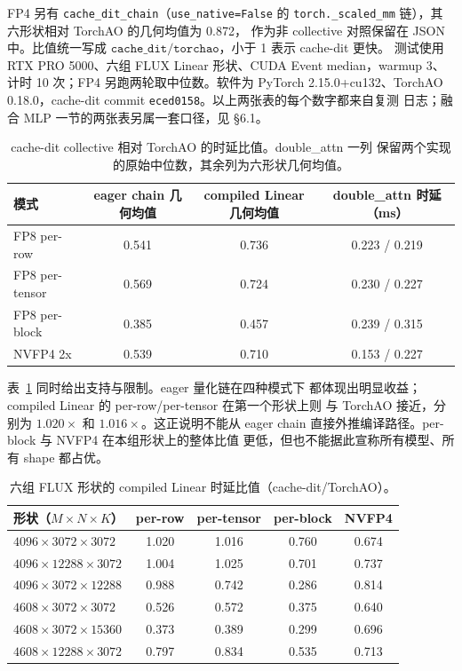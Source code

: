 FP4 另有 \texttt{cache\_dit\_chain}（\texttt{use\_native=False} 的
\texttt{torch.\_scaled\_mm} 链），其六形状相对 TorchAO 的几何均值为 0.872，
作为非 collective 对照保留在 JSON 中。比值统一写成
$\texttt{cache\_dit}/\texttt{torchao}$，小于 1 表示 cache-dit 更快。
测试使用 RTX PRO 5000、六组 FLUX Linear 形状、CUDA Event median，warmup 3、
计时 10 次；FP4 另跑两轮取中位数。软件为 PyTorch 2.15.0+cu132、TorchAO
0.18.0，cache-dit commit \texttt{eced0158}。以上两张表的每个数字都来自复测
日志；融合 MLP 一节的两张表另属一套口径，见 \S6.1。

\begin{table}[H]
\centering\small
\begin{tabular}{lccc}
\toprule
模式 & eager chain 几何均值 & compiled Linear 几何均值 & double\_attn 时延（ms） \\
\midrule
FP8 per-row    & 0.541 & 0.736 & 0.223 / 0.219 \\
FP8 per-tensor & 0.569 & 0.724 & 0.230 / 0.227 \\
FP8 per-block  & 0.385 & 0.457 & 0.239 / 0.315 \\
NVFP4 2x       & 0.539 & 0.710 & 0.153 / 0.227 \\
\bottomrule
\end{tabular}
\caption{cache-dit collective 相对 TorchAO 的时延比值。double\_attn 一列
保留两个实现的原始中位数，其余列为六形状几何均值。}
\label{tab:41-perf-summary}
\end{table}

表~\ref{tab:41-perf-summary} 同时给出支持与限制。eager 量化链在四种模式下
都体现出明显收益；compiled Linear 的 per-row/per-tensor 在第一个形状上则
与 TorchAO 接近，分别为 $1.020\times$ 和 $1.016\times$。这正说明不能从
eager chain 直接外推编译路径。per-block 与 NVFP4 在本组形状上的整体比值
更低，但也不能据此宣称所有模型、所有 shape 都占优。

\begin{table}[H]
\centering\small
\begin{tabular}{lcccc}
\toprule
形状（$M\times N\times K$） & per-row & per-tensor & per-block & NVFP4 \\
\midrule
$4096\times3072\times3072$   & 1.020 & 1.016 & 0.760 & 0.674 \\
$4096\times12288\times3072$  & 1.004 & 1.025 & 0.701 & 0.737 \\
$4096\times3072\times12288$  & 0.988 & 0.742 & 0.286 & 0.814 \\
$4608\times3072\times3072$   & 0.526 & 0.572 & 0.375 & 0.640 \\
$4608\times3072\times15360$  & 0.373 & 0.389 & 0.299 & 0.696 \\
$4608\times12288\times3072$  & 0.797 & 0.834 & 0.535 & 0.713 \\
\bottomrule
\end{tabular}
\caption{六组 FLUX 形状的 compiled Linear 时延比值（cache-dit/TorchAO）。}
\label{tab:41-perf-shapes}
\end{table}

